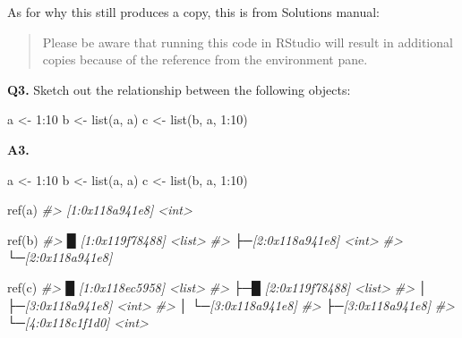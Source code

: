\documentclass[
]{book}
\newenvironment{Shaded}{\begin{snugshade}}{\end{snugshade}}
\newcommand{\CommentTok}[1]{\textcolor[rgb]{0.56,0.35,0.01}{\textit{#1}}}
\newcommand{\DecValTok}[1]{\textcolor[rgb]{0.00,0.00,0.81}{#1}}
\newcommand{\FunctionTok}[1]{\textcolor[rgb]{0.00,0.00,0.00}{#1}}
\newcommand{\NormalTok}[1]{#1}
\newcommand{\OtherTok}[1]{\textcolor[rgb]{0.56,0.35,0.01}{#1}}
\newcommand{\SpecialCharTok}[1]{\textcolor[rgb]{0.00,0.00,0.00}{#1}}
\begin{document}
As for why this still produces a copy, this is from Solutions manual:

\begin{quote}
Please be aware that running this code in RStudio will result in additional copies because of the reference from the environment pane.
\end{quote}

\textbf{Q3.} Sketch out the relationship between the following objects:

\begin{Shaded}
\begin{Highlighting}[]
\NormalTok{a }\OtherTok{\textless{}{-}} \DecValTok{1}\SpecialCharTok{:}\DecValTok{10}
\NormalTok{b }\OtherTok{\textless{}{-}} \FunctionTok{list}\NormalTok{(a, a)}
\NormalTok{c }\OtherTok{\textless{}{-}} \FunctionTok{list}\NormalTok{(b, a, }\DecValTok{1}\SpecialCharTok{:}\DecValTok{10}\NormalTok{)}
\end{Highlighting}
\end{Shaded}

\textbf{A3.}

\begin{Shaded}
\begin{Highlighting}[]
\NormalTok{a }\OtherTok{\textless{}{-}} \DecValTok{1}\SpecialCharTok{:}\DecValTok{10}
\NormalTok{b }\OtherTok{\textless{}{-}} \FunctionTok{list}\NormalTok{(a, a)}
\NormalTok{c }\OtherTok{\textless{}{-}} \FunctionTok{list}\NormalTok{(b, a, }\DecValTok{1}\SpecialCharTok{:}\DecValTok{10}\NormalTok{)}

\FunctionTok{ref}\NormalTok{(a)}
\CommentTok{\#\textgreater{} [1:0x118a941e8] \textless{}int\textgreater{}}

\FunctionTok{ref}\NormalTok{(b)}
\CommentTok{\#\textgreater{} █ [1:0x119f78488] \textless{}list\textgreater{} }
\CommentTok{\#\textgreater{} ├─[2:0x118a941e8] \textless{}int\textgreater{} }
\CommentTok{\#\textgreater{} └─[2:0x118a941e8]}

\FunctionTok{ref}\NormalTok{(c)}
\CommentTok{\#\textgreater{} █ [1:0x118ec5958] \textless{}list\textgreater{} }
\CommentTok{\#\textgreater{} ├─█ [2:0x119f78488] \textless{}list\textgreater{} }
\CommentTok{\#\textgreater{} │ ├─[3:0x118a941e8] \textless{}int\textgreater{} }
\CommentTok{\#\textgreater{} │ └─[3:0x118a941e8] }
\CommentTok{\#\textgreater{} ├─[3:0x118a941e8] }
\CommentTok{\#\textgreater{} └─[4:0x118c1f1d0] \textless{}int\textgreater{}}
\end{Highlighting}
\end{Shaded}
\end{document}
